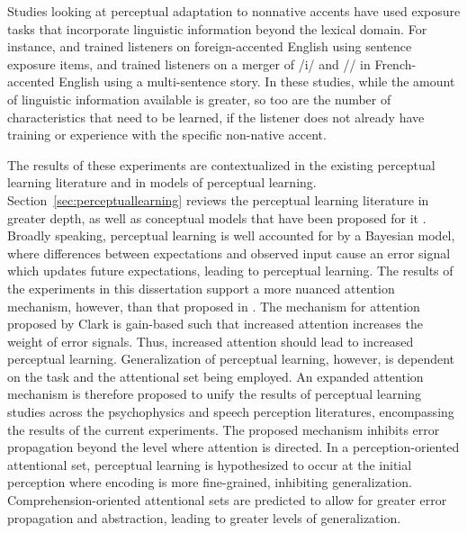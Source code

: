 Studies looking at perceptual adaptation to nonnative accents have used exposure tasks that incorporate linguistic information beyond the lexical domain.  
For instance, \citet{Clarke2004} and \citet{Bradlow2008} trained listeners on foreign-accented English using sentence exposure items, and \citet{Trude2013} trained listeners on a merger of /i/ and /\textsci/ in French-accented English using a multi-sentence story.
In these studies, while the amount of linguistic information available is greater, so too are the number of characteristics that need to be learned, if the listener does not already have training or experience with the specific non-native accent.



The results of these experiments are contextualized in the existing perceptual learning literature and in models of perceptual learning.
Section~\ref{sec:perceptuallearning} reviews the perceptual learning literature in greater depth, as well as conceptual models that have been proposed for it \citep{Clark2013, Kleinschmidt2011}.
Broadly speaking, perceptual learning is well accounted for by a Bayesian model, where differences between expectations and observed input cause an error signal which updates future expectations, leading to perceptual learning.
The results of the experiments in this dissertation support a more nuanced attention mechanism, however, than that proposed in \citet{Clark2013}.
The mechanism for attention proposed by Clark is gain-based such that increased attention increases the weight of error signals.
Thus, increased attention should lead to increased perceptual learning.
Generalization of perceptual learning, however, is dependent on the task and the attentional set being employed.
An expanded attention mechanism is therefore proposed to unify the results of perceptual learning studies across the psychophysics and speech perception literatures, encompassing the results of the current experiments.
The proposed mechanism inhibits error propagation beyond the level where attention is directed.  
In a perception-oriented attentional set, perceptual learning is hypothesized to occur at the initial perception where encoding is more fine-grained, inhibiting generalization.  
Comprehension-oriented attentional sets are predicted to allow for greater error propagation and abstraction, leading to greater levels of generalization.